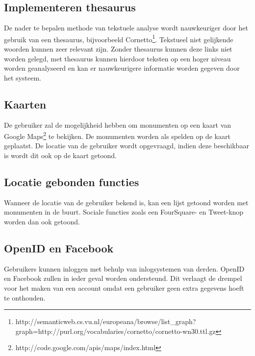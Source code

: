 \documentclass[a4paper,10pt]{article}
\begin{document}
            \subsection{Implementeren thesaurus}
            De nader te bepalen methode van tekstuele analyse wordt nauwkeuriger door het gebruik van een thesaurus, bijvoorbeeld Cornetto\footnote{http://semanticweb.cs.vu.nl/europeana/browse/list\_graph?graph=http://purl.org/vocabularies/cornetto/cornetto-wn30.ttl.gz}. Tekstueel niet gelijkende woorden kunnen zeer relevant zijn. Zonder thesaurus kunnen deze links niet worden gelegd, met thesaurus kunnen hierdoor teksten op een hoger niveau worden geanalyseerd en kan er nauwkeurigere informatie worden gegeven door het systeem.
        
            \subsection{Kaarten}
            De gebruiker zal de mogelijkheid hebben om monumenten op een kaart van Google Maps\footnote{http://code.google.com/apis/maps/index.html} te bekijken. De monumenten worden als spelden op de kaart geplaatst. De locatie van de gebruiker wordt opgevraagd, indien deze beschikbaar is wordt dit ook op de kaart getoond.
            
            \subsection{Locatie gebonden functies}
            Wanneer de locatie van de gebruiker bekend is, kan een lijst getoond worden met monumenten in de buurt. Sociale functies zoals een FourSquare- en Tweet-knop worden dan ook getoond.
            
            \subsection{OpenID en Facebook}
            Gebruikers kunnen inloggen met behulp van inlogsystemen van derden. OpenID en Facebook zullen in ieder geval worden ondersteund. Dit verlaagt de drempel voor het maken van een account omdat een gebruiker geen extra gegevens hoeft te onthouden.
		
		\clearpage
\end{document}

